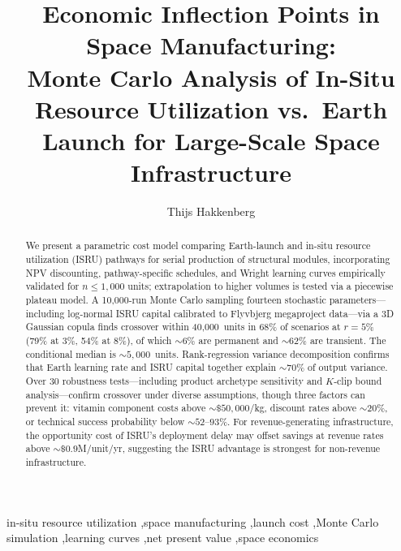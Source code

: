 \documentclass[preprint,12pt]{elsarticle}
\begin{document}
\begin{frontmatter}

\title{Economic Inflection Points in Space Manufacturing:\\ Monte Carlo Analysis of In-Situ Resource Utilization vs.\ Earth Launch for Large-Scale Space Infrastructure}

\author[dyson]{Thijs Hakkenberg}

\address[dyson]{Project Dyson, Open Research Initiative}

\begin{abstract}
We present a parametric cost model comparing Earth-launch and in-situ resource utilization (ISRU) pathways for serial production of structural modules, incorporating NPV discounting, pathway-specific schedules, and Wright learning curves empirically validated for $n \leq 1{,}000$ units; extrapolation to higher volumes is tested via a piecewise plateau model. A 10{,}000-run Monte Carlo sampling fourteen stochastic parameters---including log-normal ISRU capital calibrated to Flyvbjerg megaproject data---via a 3D Gaussian copula finds crossover within 40{,}000~units in 68\% of scenarios at $r = 5\%$ (79\% at 3\%, 54\% at 8\%), of which ${\sim}6\%$ are permanent and ${\sim}62\%$ are transient. The conditional median is ${\sim}5{,}000$~units. Rank-regression variance decomposition confirms that Earth learning rate and ISRU capital together explain ${\sim}70\%$ of output variance. Over 30 robustness tests---including product archetype sensitivity and $K$-clip bound analysis---confirm crossover under diverse assumptions, though three factors can prevent it: vitamin component costs above ${\sim}\$50{,}000$/kg, discount rates above ${\sim}20\%$, or technical success probability below ${\sim}52$--$93\%$. For revenue-generating infrastructure, the opportunity cost of ISRU's deployment delay may offset savings at revenue rates above ${\sim}\$0.9$M/unit/yr, suggesting the ISRU advantage is strongest for non-revenue infrastructure.
\end{abstract}

\begin{keyword}
in-situ resource utilization \sep space manufacturing \sep launch cost \sep Monte Carlo simulation \sep learning curves \sep net present value \sep space economics
\end{keyword}

\end{frontmatter}
\end{document}
